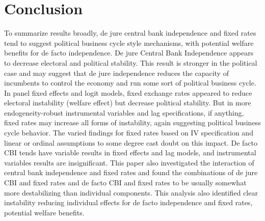 \documentclass{article}
\begin{document}
    \section*{Conclusion}

    To summarize results broadly, de jure central bank independence and fixed rates tend to suggest political business cycle style mechanisms, with potential welfare benefits for de facto independence. De jure Central Bank Independence appears to decrease electoral and political stability. This result is stronger in the political case and may suggest that de jure independence reduces the capacity of incumbents to control the economy and run some sort of political business cycle.  In panel fixed effects and logit models, fixed exchange rates appeared to reduce electoral instability (welfare effect) but decrease political stability. But in more endogeneity-robust instrumental variables and lag specifications, if anything, fixed rates may increase all forms of instability, again suggesting political business cycle behavior. The varied findings for fixed rates based on IV specification and linear or ordinal assumptions to some degree cast doubt on this impact. De facto CBI tends have variable results in fixed effects and lag models, and instrumental variables results are insignificant. This paper also investigated the interaction of central bank independence and fixed rates and found the combinations of de jure CBI and fixed rates and de facto CBI and fixed rates to be usually somewhat more destabilizing than individual components. This analysis also identified clear instability reducing individual effects for de facto independence and fixed rates, potential welfare benefits.
\end{document}
